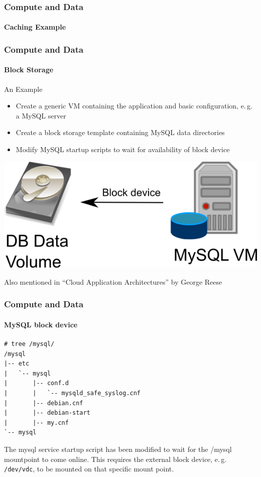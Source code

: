 \begin{frame}
\frametitle{Compute and Data}
\framesubtitle{Caching Example}
\end{frame}


\begin{frame}
\frametitle{Compute and Data}
\framesubtitle{Block Storage}
An Example
\begin{itemize}
\item Create a generic VM containing the application and basic
  configuration, e.\,g. a MySQL server
\item Create a block storage template containing MySQL data directories
\item Modify MySQL startup scripts to wait for availability of block device
\end{itemize}
\begin{center}
\includegraphics[width=.4\textwidth]{images/DBaaS.png}
\end{center}
\hfill\tiny Also mentioned in ``Cloud Application Architectures'' by George Reese
\end{frame}

\begin{frame}[fragile]
\frametitle{Compute and Data}
\framesubtitle{MySQL block device}
\begin{lstlisting}
# tree /mysql/
/mysql
|-- etc
|   `-- mysql
|       |-- conf.d
|       |   `-- mysqld_safe_syslog.cnf
|       |-- debian.cnf
|       |-- debian-start
|       |-- my.cnf
`-- mysql
\end{lstlisting}
The mysql service startup script has been modified to wait for the
/mysql mountpoint to come online. This requires the external block
device, e.\,g. \texttt{/dev/vdc}, to be mounted on that specific mount
point.
\end{frame}

